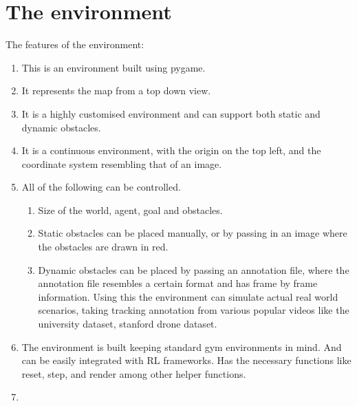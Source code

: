 \section{The environment}
The features of the environment:
\begin{enumerate}
    \item This is an environment built using pygame.
    \item It represents the map from a top down view. 
    \item It is a highly customised environment and can support both static and dynamic obstacles.
    \item It is a continuous environment, with the origin on the top left, and the coordinate system resembling that of an image.
    \item All of the following can be controlled.
        \begin{enumerate}
            \item Size of the world, agent, goal and obstacles.
            \item Static obstacles can be placed manually, or by passing in an image where the obstacles are drawn in red.
            \item Dynamic obstacles can be placed by passing an annotation file, where the annotation file resembles a certain format and has frame by frame information.
            Using this the environment can simulate actual real world scenarios, taking tracking annotation from various popular videos like the university dataset, stanford drone dataset.
        \end{enumerate}
    \item The environment is built keeping standard gym environments in mind. And can be easily integrated with RL frameworks. Has the necessary functions like reset, step, and render among other helper functions.
    \item 
\end{enumerate}